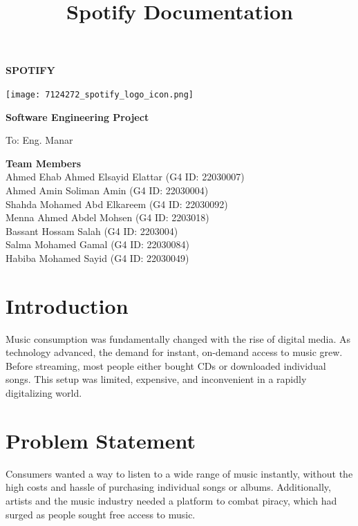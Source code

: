 \documentclass[a4paper,10pt]{article}
\title{\Huge \textbf{Spotify Documentation}}
\date{}
\begin{document}
\begin{titlepage}
    \centering
    \vspace*{2cm}
    
    \Huge
    \textbf{SPOTIFY}

    \vspace{1cm}
    \texttt{[image: 7124272\_spotify\_logo\_icon.png]}

    \vspace{1cm}
    \Huge
    \textbf{Software Engineering Project}

    \vspace{1cm}
    \LARGE
    To: Eng. Manar

    \vfill
    
    \Large
    \textbf{Team Members} \\
    Ahmed Ehab Ahmed Elsayid Elattar (G4 ID: 22030007) \\
    Ahmed Amin Soliman Amin (G4 ID: 22030004) \\
    Shahda Mohamed Abd Elkareem (G4 ID: 22030092) \\
    Menna Ahmed Abdel Mohsen (G4 ID: 2203018) \\
    Bassant Hossam Salah (G4 ID: 2203004) \\
    Salma Mohamed Gamal (G4 ID: 22030084) \\
    Habiba Mohamed Sayid (G4 ID: 22030049)

    \vspace{2cm}
\end{titlepage}

\newpage
\tableofcontents
\newpage

\section{Introduction}
Music consumption was fundamentally changed with the rise of digital media. As technology advanced, the demand for instant, on-demand access to music grew. Before streaming, most people either bought CDs or downloaded individual songs. This setup was limited, expensive, and inconvenient in a rapidly digitalizing world.

\section{Problem Statement}
Consumers wanted a way to listen to a wide range of music instantly, without the high costs and hassle of purchasing individual songs or albums. Additionally, artists and the music industry needed a platform to combat piracy, which had surged as people sought free access to music.
\end{document}
